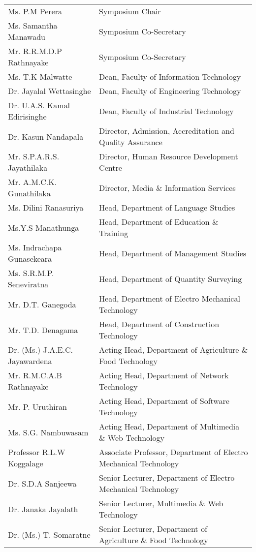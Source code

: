 \begin{longtable}{ L{4.8cm}  L{6.5cm} } 
   
    Ms. P.M Perera & Symposium Chair \\
    Ms. Samantha Manawadu & Symposium Co-Secretary \\
    Mr. R.R.M.D.P Rathnayake & Symposium Co-Secretary \\
    Ms. T.K Malwatte & Dean, Faculty of Information Technology \\
    Dr. Jayalal Wettasinghe & Dean, Faculty of Engineering Technology \\
    Dr. U.A.S. Kamal Edirisinghe & Dean, Faculty of Industrial Technology \\
    Dr. Kasun Nandapala & Director, Admission, Accreditation and Quality Assurance \\
    Mr. S.P.A.R.S. Jayathilaka & Director, Human Resource Development Centre \\
    Mr. A.M.C.K. Gunathilaka & Director, Media \& Information Services \\
    Ms. Dilini Ranasuriya & Head, Department of Language Studies \\
    Ms.Y.S Manathunga & Head, Department of Education \& Training \\
    Ms. Indrachapa Gunasekeara & Head, Department of Management Studies \\
    Ms. S.R.M.P. Seneviratna & Head, Department of Quantity Surveying \\
    Mr. D.T. Ganegoda & Head, Department of Electro Mechanical Technology \\
    Mr. T.D. Denagama & Head, Department of Construction Technology \\
    Dr. (Ms.) J.A.E.C. Jayawardena & Acting Head, Department of Agriculture \& Food Technology \\
    Mr. R.M.C.A.B Rathnayake & Acting Head, Department of Network Technology \\
    Mr. P. Uruthiran & Acting Head, Department of Software Technology \\
    Ms. S.G. Nambuwasam & Acting Head, Department of Multimedia \& Web Technology \\
    Professor R.L.W Koggalage & Associate Professor, Department of Electro Mechanical Technology \\
    Dr. S.D.A Sanjeewa & Senior Lecturer, Department of Electro Mechanical Technology \\
    Dr. Janaka Jayalath & Senior Lecturer, Multimedia \& Web Technology \\
    Dr. (Ms.) T. Somaratne & Senior Lecturer, Department of Agriculture \& Food Technology \\
    

\end{longtable}
